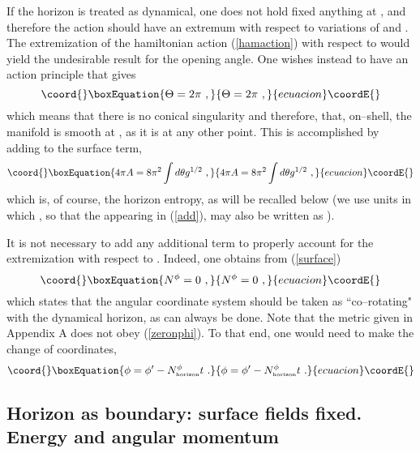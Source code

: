 \documentclass[a4paper,preprintnumbers,amsmath,amssymb]{revtex4}
\begin{document}
If the horizon is treated as dynamical, one does not hold fixed anything at \coordHE{}, and therefore the action should have an extremum with respect to variations of
\coordHE{} and \myHighlight{$\pi^{\phi}_{\rho}$}\coordHE{}. The extremization of the hamiltonian action (\ref{hamaction}) with respect to \coordHE{} would yield the undesirable result
\coordHE{} for the opening angle. One wishes instead to have an action principle that gives
\begin{equation}\coord{}\boxEquation{
\Theta=2\pi \ ,
\label{noconical}
}{
\Theta=2\pi \ ,
}{ecuacion}\coordE{}\end{equation}
which means that there is no conical singularity and therefore, that, on--shell,
the manifold is smooth at \coordHE{}, as it is at any other point.
This is accomplished by adding to \coordHE{} the surface term\cite{BTZ},
\begin{equation}\coord{}\boxEquation{
4\pi A = 8\pi^2\int d\theta g^{1/2} \ ,
\label{add}
}{
4\pi A = 8\pi^2\int d\theta g^{1/2} \ ,
}{ecuacion}\coordE{}\end{equation}
which is, of course, the horizon entropy,
 as will be recalled below (we use units in which \coordHE{}, so that the \myHighlight{$4\pi$}\coordHE{} appearing in (\ref{add}), may also be written as \coordHE{}).

It is not necessary to add any additional term to properly account for the extremization
with respect to \myHighlight{$\pi_{\ \phi}^{\rho}$}\coordHE{}. Indeed, one obtains from (\ref{surface})
\begin{equation}\coord{}\boxEquation{
N^{\phi} = 0 \ ,
\label{zeronphi}
}{
N^{\phi} = 0 \ ,
}{ecuacion}\coordE{}\end{equation}
which states that the angular coordinate system  should be taken as ``co--rotating"
with the dynamical horizon, as can always be done.  Note that the metric given in Appendix A does not obey (\ref{zeronphi}). To that end,
one would need to make the change of coordinates,
\begin{equation}\coord{}\boxEquation{
\phi =  \phi'-N^{\phi}_{\mbox{\tiny horizon}}t \ .
\label{ccc}
}{
\phi =  \phi'-N^{\phi}_{\mbox{\tiny horizon}}t \ .
}{ecuacion}\coordE{}\end{equation}


\subsection*{Horizon as boundary: surface fields fixed. Energy and angular momentum}
\end{document}
